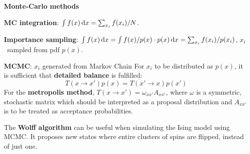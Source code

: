 \documentclass[10pt,landscape]{article}
\newcommand{\topiccolor}{green}
\newcommand{\topic}[2]{%
	\renewcommand{\topiccolor}{#1}
	\begin{tcolorbox}[boxsep=0.5mm, left=1mm, right=1mm, top=0mm, bottom=0mm,
		colback=#1!30, colframe=#1, arc is angular]%
		\centering \textbf{#2}%
	\end{tcolorbox}%
}
\newcommand{\cbf}[1]{\textcolor{\topiccolor!80!black}{\textbf{#1}}}
\begin{document}
\begin{multicols*}{3}
\topic{red}{Monte-Carlo methods}

\cbf{MC integration}:
$\int f(x) \dl x = \sum_{x_i} f(x_i)/N$.

\cbf{Importance sampling}:
$\int f(x) \dl x = \int f(x)/p(x) \cdot p(x) \dl x = \sum_{x_i} f(x_i) / p(x_i)$,
$x_i$ sampled from pdf $p(x)$.

\cbf{MCMC}: $x_i$ generated from Markov Chain
For $x_i$ to be distributed as $p(x)$, it is sufficient that
\cbf{detailed balance} is fulfilled:
\[
	T(x \to x') p(x) = T(x' \to x) p(x')
\]
For the \cbf{metropolis method}, $T(x \to x') = \omega_{xx'}A_{x x'}$,
where $\omega$ is a symmetric, stochastic matrix which should
be interpreted as a proposal distribution and $A_{x x'}$ is
to be treated as acceptance probabilities.

The \cbf{Wolff algorithm} can be useful when simulating the Ising model
using MCMC.
It proposes new states where entire clusters of spins are flipped,
instead of just one.


\end{multicols*}
\end{document}
